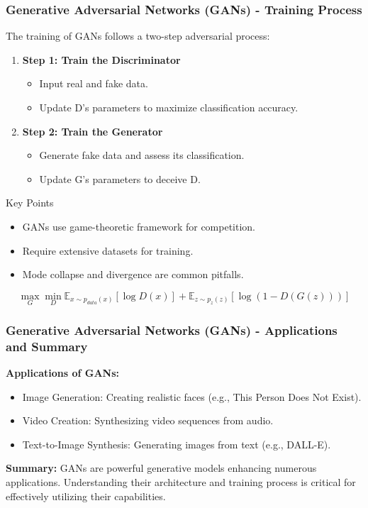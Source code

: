\documentclass[aspectratio=169]{beamer}
\begin{document}
\begin{frame}[fragile]
    \frametitle{Generative Adversarial Networks (GANs) - Training Process}
    The training of GANs follows a two-step adversarial process:
    \begin{enumerate}
        \item \textbf{Step 1: Train the Discriminator}
            \begin{itemize}
                \item Input real and fake data.
                \item Update D's parameters to maximize classification accuracy.
            \end{itemize}
        \item \textbf{Step 2: Train the Generator}
            \begin{itemize}
                \item Generate fake data and assess its classification.
                \item Update G's parameters to deceive D.
            \end{itemize}
    \end{enumerate}
    \begin{block}{Key Points}
        \begin{itemize}
            \item GANs use game-theoretic framework for competition.
            \item Require extensive datasets for training.
            \item Mode collapse and divergence are common pitfalls.
        \end{itemize}
    \end{block}
    \begin{equation}
        \max_G \min_D \mathbb{E}_{x \sim p_{data}(x)} [\log D(x)] + \mathbb{E}_{z \sim p_z(z)} [\log(1 - D(G(z)))]
    \end{equation}
\end{frame}

\begin{frame}[fragile]
    \frametitle{Generative Adversarial Networks (GANs) - Applications and Summary}
    \textbf{Applications of GANs:}
    \begin{itemize}
        \item Image Generation: Creating realistic faces (e.g., This Person Does Not Exist).
        \item Video Creation: Synthesizing video sequences from audio.
        \item Text-to-Image Synthesis: Generating images from text (e.g., DALL-E).
    \end{itemize}
    
    \textbf{Summary:} GANs are powerful generative models enhancing numerous applications. Understanding their architecture and training process is critical for effectively utilizing their capabilities.
\end{frame}
\end{document}
